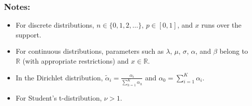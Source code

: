 \subsubsection*{Notes:}
\begin{itemize}
    \item For discrete distributions, $n\in\{0,1,2,\dots\}$, $p\in[0,1]$, and $x$ runs over the support.
    \item For continuous distributions, parameters such as $\lambda$, $\mu$, $\sigma$, $\alpha$, and $\beta$ belong to $\mathbb{R}$ (with appropriate restrictions) and $x\in\mathbb{R}$.
    \item In the Dirichlet distribution, $\tilde{\alpha}_i=\frac{\alpha_i}{\sum_{h=1}^K\alpha_h}$ and $\alpha_0=\sum_{i=1}^K \alpha_i$.
    \item For Student's t-distribution, $\nu>1$.
\end{itemize}